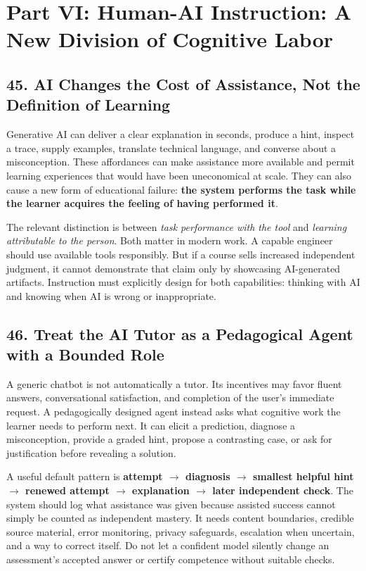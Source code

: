\section*{Part VI: Human-AI Instruction: A New Division of Cognitive Labor}

\subsection*{45. AI Changes the Cost of Assistance, Not the Definition of Learning}

Generative AI can deliver a clear explanation in seconds, produce a hint, inspect a trace, supply examples, translate technical language, and converse about a misconception. These affordances can make assistance more available and permit learning experiences that would have been uneconomical at scale. They can also cause a new form of educational failure: \textbf{the system performs the task while the learner acquires the feeling of having performed it}.

The relevant distinction is between \emph{task performance with the tool} and \emph{learning attributable to the person}. Both matter in modern work. A capable engineer should use available tools responsibly. But if a course sells increased independent judgment, it cannot demonstrate that claim only by showcasing AI-generated artifacts. Instruction must explicitly design for both capabilities: thinking with AI and knowing when AI is wrong or inappropriate.

\subsection*{46. Treat the AI Tutor as a Pedagogical Agent with a Bounded Role}

A generic chatbot is not automatically a tutor. Its incentives may favor fluent answers, conversational satisfaction, and completion of the user's immediate request. A pedagogically designed agent instead asks what cognitive work the learner needs to perform next. It can elicit a prediction, diagnose a misconception, provide a graded hint, propose a contrasting case, or ask for justification before revealing a solution.

A useful default pattern is \textbf{attempt $\to$ diagnosis $\to$ smallest helpful hint $\to$ renewed attempt $\to$ explanation $\to$ later independent check}. The system should log what assistance was given because assisted success cannot simply be counted as independent mastery. It needs content boundaries, credible source material, error monitoring, privacy safeguards, escalation when uncertain, and a way to correct itself. Do not let a confident model silently change an assessment's accepted answer or certify competence without suitable checks.

